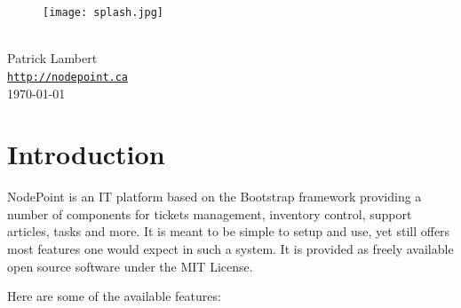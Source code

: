 \documentclass[11pt]{article}
\begin{document}
\begin{titlepage}
\bigskip
\begin{center}
\begin{figure}
\texttt{[image: splash.jpg]}
\end{figure}
\vspace*{1cm}
{
{\Huge \color{headings}{\NodePointManual}}\\
\bigskip
{\Large Patrick Lambert}\\
\texttt{\url{http://nodepoint.ca}}\\ 
\bigskip
\today}
\vspace*{\fill}
\end{center}
\end{titlepage}

\tableofcontents

\newpage

\section{Introduction}

NodePoint is an IT platform based on the Bootstrap framework providing a number of components for tickets management, inventory control, support articles, tasks and more. It is meant to be simple to setup and use, yet still offers most features one would expect in such a system. It is provided as freely available open source software under the MIT License.

Here are some of the available features:
\end{document}
